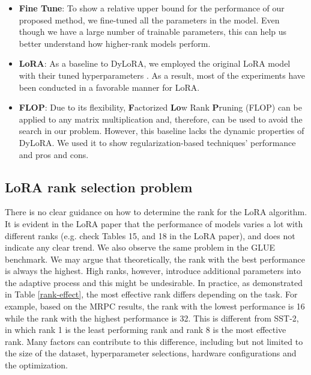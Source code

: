 \begin{itemize}
    \item \textbf{Fine Tune}: To show a relative upper bound for the performance of our proposed method, we fine-tuned all the parameters in the model. Even though we have a large number of trainable parameters, this can help us better understand how higher-rank models perform.

    \item \textbf{LoRA}: As a baseline to DyLoRA, we employed the original LoRA model with their tuned hyperparameters \cite{hu2021lora}. As a result, most of the experiments have been conducted in a favorable manner for LoRA. 

    \item \textbf{FLOP}: Due to its flexibility, \textbf{F}actorized \textbf{Lo}w Rank \textbf{P}runing (FLOP) \cite{wang2019structured} can be applied to any matrix multiplication and, therefore, can be used to avoid the search in our problem. However, this baseline lacks the dynamic properties of DyLoRA. We used it to show regularization-based techniques' performance and pros and cons.
\end{itemize}

\subsection{LoRA rank selection problem} 

There is no clear guidance on how to determine the rank for the LoRA algorithm. It is evident in the LoRA paper \cite{hu2021lora} that the performance of models varies a lot with different ranks (e.g. check Tables 15, and 18 in the LoRA paper), and does not indicate any clear trend. We also observe the same problem in the GLUE benchmark. We may argue that theoretically, the rank with the best performance is always the highest. High ranks, however, introduce additional parameters into the adaptive process and this might be undesirable. In practice, as demonstrated in Table \ref{rank-effect}, the most effective rank differs depending on the task. For example, based on the MRPC results, the rank with the lowest performance is 16 while the rank with the highest performance is 32. This is different from SST-2, in which rank 1 is the least performing rank and rank 8 is the most effective rank. Many factors can contribute to this difference, including but not limited to the size of the dataset, hyperparameter selections, hardware configurations and the optimization. 

